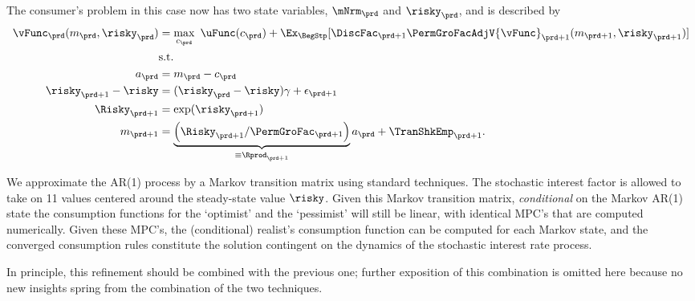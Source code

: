 \documentclass[\econtexRoot/SolvingMicroDSOPs]{subfiles}
\begin{document}
The consumer's problem in this case now has two state variables, $\mNrm_{\prd}$ and $\risky_{\prd}$, and
is described by
\begin{equation}\begin{gathered}\begin{aligned}
      {\vFunc}_{\prd}({m}_{\prd},\risky_{\prd})  & = \max_{{c}_{\prd}} ~ \uFunc({c}_{\prd})+
      \Ex_{\BegStp}[{\DiscFac}_{\prd+1}\PermGroFacAdjV{\vFunc}_{\prd+1}({m}_{\prd+1},\risky_{\prd+1})] \label{vNormedRisky}
      \\         & \text{s.t.}   \nonumber \\
      {a}_{\prd}    & = {m}_{\prd}-{c}_{\prd} \nonumber
      \\      \risky_{\prd+1}-\risky  & = (\risky_{\prd}-\risky)\gamma + \epsilon_{\prd+1} \notag
      \\      \Risky_{\prd+1}  & = \exp(\risky_{\prd+1}) \notag
      \\      {m}_{\prd+1}  & = \underbrace{\left(\Risky_{\prd+1}/\PermGroFac_{\prd+1}\right)}_{\equiv \Rprod_{\prd+1}}{a}_{\prd}+\TranShkEmp_{\prd+1} \nonumber.
    \end{aligned}\end{gathered}\end{equation}


We approximate the AR(1) process by a Markov transition matrix using standard techniques.  The stochastic interest factor is allowed to take
on 11 values centered around the steady-state value $\risky$.  Given this Markov transition matrix, \textit{conditional} on the Markov AR(1) state the consumption functions for the `optimist' and the `pessimist' will still be linear,
with identical MPC's that are computed numerically.  Given these MPC's, the (conditional) realist's consumption function can be computed for each Markov state, and the converged consumption rules constitute the solution contingent on the dynamics of the stochastic
interest rate process.

In principle, this refinement should be combined with the previous one;
further exposition of this combination is omitted here because no new
insights spring from the combination of the two techniques.



\hypertarget{imposing-artificial-borrowing-constraints}{}
\end{document}
